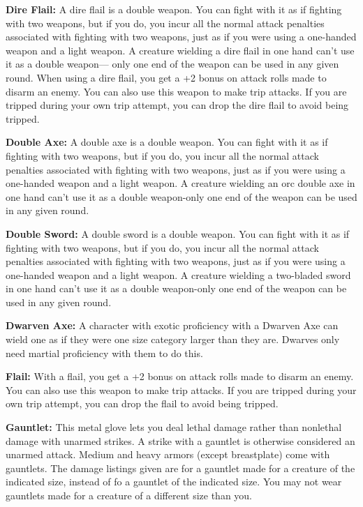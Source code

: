 \textbf{Dire Flail:} A dire flail is a double weapon. You can fight with it as if fighting with two weapons, but if you do, you incur all the normal attack penalties associated with fighting with two weapons, just as if you were using a one-handed weapon and a light weapon. A creature wielding a dire flail in one hand can't use it as a double weapon— only one end of the weapon can be used in any given round. When using a dire flail, you get a +2 bonus on attack rolls made to disarm an enemy. You can also use this weapon to make trip attacks. If you are tripped during your own trip attempt, you can drop the dire flail to avoid being tripped.

\textbf{Double Axe:} A double axe is a double weapon. You can fight with it as if fighting with two weapons, but if you do, you incur all the normal attack penalties associated with fighting with two weapons, just as if you were using a one-handed weapon and a light weapon. A creature wielding an orc double axe in one hand can't use it as a double weapon-only one end of the weapon can be used in any given round.

\textbf{Double Sword:} A double sword is a double weapon. You can fight with it as if fighting with two weapons, but if you do, you incur all the normal attack penalties associated with fighting with two weapons, just as if you were using a one-handed weapon and a light weapon. A creature wielding a two-bladed sword in one hand can't use it as a double weapon-only one end of the weapon can be used in any given round.

\textbf{Dwarven Axe:} A character with exotic proficiency with a Dwarven Axe can wield one as if they were one size category larger than they are. Dwarves only need martial proficiency with them to do this.

\textbf{Flail:} With a flail, you get a +2 bonus on attack rolls made to disarm an enemy. You can also use this weapon to make trip attacks. If you are tripped during your own trip attempt, you can drop the flail to avoid being tripped.

\textbf{Gauntlet:} This metal glove lets you deal lethal damage rather than nonlethal damage with unarmed strikes. A strike with a gauntlet is otherwise considered an unarmed attack. Medium and heavy armors (except breastplate) come with gauntlets. The damage listings given are for a gauntlet made for a creature of the indicated size, instead of fo a gauntlet of the indicated size. You may not wear gauntlets made for a creature of a different size than you.

